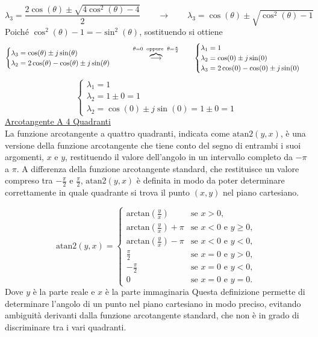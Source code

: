 ﻿\documentclass[11pt, a4paper]{article}
\begin{document}
\[
    \lambda_{3} = \frac{2\cos(\theta) \pm \sqrt{4\cos^2(\theta) - 4}}{2}
    \qquad\longrightarrow\qquad
    \lambda_{3} = \cos(\theta) \pm \sqrt{\cos^2(\theta) - 1}
\]
Poiché \(\cos^2(\theta) - 1 = -\sin^2(\theta)\), sostituendo si ottiene
\[
    \begin{cases}
        \lambda_{3} = \cos(\theta) \pm j\sin(\theta)\\
        \lambda_{2} = 2\cos(\theta) - \cos(\theta) \pm j\sin(\theta)
    \end{cases}
    \qquad\overbrace{\longrightarrow}^{\theta = 0 \text{\; oppure \;} \theta = \frac{\pi}{2}}\qquad
    \begin{cases}
        \lambda_{1} = 1\\
        \lambda_{2} = \cos(0) \pm j\sin(0) \\
        \lambda_{3} = 2\cos(0) - \cos(0) \pm j\sin(0)
    \end{cases}
\]
\[
    \begin{cases}
        \lambda_{1} = 1\\
        \lambda_{2} = 1 \pm 0 = 1\\
        \lambda_{2} = \cos(0) \pm j\sin(0) = 1 \pm 0 = 1
    \end{cases}
\]
\underline{Arcotangente A 4 Quadranti}\\
La funzione arcotangente a quattro quadranti, indicata come \(\text{atan2}(y, x)\), è una versione della funzione arcotangente che tiene conto del segno di entrambi i suoi argomenti, \(x\) e \(y\), restituendo il valore dell'angolo in un intervallo completo da \(-\pi\) a \(\pi\). A differenza della funzione arcotangente standard, che restituisce un valore compreso tra \(-\frac{\pi}{2}\) e \(\frac{\pi}{2}\), \(\text{atan2}(y, x)\) è definita in modo da poter determinare correttamente in quale quadrante si trova il punto \((x, y)\) nel piano cartesiano.

\[
\text{atan2}(y, x) =
\begin{cases}
\text{arctan}\left(\frac{y}{x}\right) & \text{se } x > 0, \\
\text{arctan}\left(\frac{y}{x}\right) + \pi & \text{se } x < 0 \text{ e } y \geq 0, \\
\text{arctan}\left(\frac{y}{x}\right) - \pi & \text{se } x < 0 \text{ e } y < 0, \\
\frac{\pi}{2} & \text{se } x = 0 \text{ e } y > 0, \\
-\frac{\pi}{2} & \text{se } x = 0 \text{ e } y < 0, \\
0 & \text{se } x = 0 \text{ e } y = 0.
\end{cases}
\]
Dove \(y\) è la parte reale e \(x\) è la parte immaginaria
Questa definizione permette di determinare l'angolo di un punto nel piano cartesiano in modo preciso, evitando ambiguità derivanti dalla funzione arcotangente standard, che non è in grado di discriminare tra i vari quadranti.
\newpage
\end{document}
